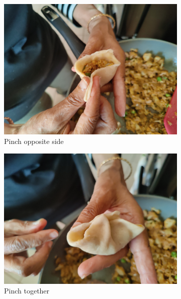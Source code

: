 \begin{figure}[H]
  \begin{subfigure}[b]{0.3\textwidth}
    \includegraphics[width=\textwidth]{Samosa/Images/IMG_20231230_143831.jpg}
    \caption{Pinch opposite side}
  \end{subfigure}
  \hfill
  \begin{subfigure}{0.3\textwidth}
    \includegraphics[width=\linewidth]{Samosa/Images/IMG_20231230_143841.jpg}
    \caption{Pinch together}
  \end{subfigure}
  \hfill
  \begin{subfigure}{0.3\textwidth}

\end{subfigure}
\end{figure}
